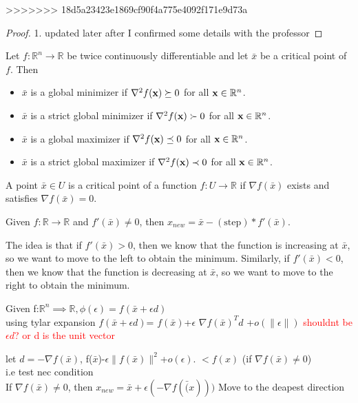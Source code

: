 >>>>>>> 18d5a23423e1869cf90f4a775e4092f171e9d73a
\begin{proof}
    1. updated later after I confirmed some details with the professor
\end{proof}
\begin{theorem}[]
  Let $f: \mathbb R^n \to \mathbb R$ be twice continuously differentiable and let $\bar{x}$ be a critical point of $f$. Then
  \begin{itemize}
    \item $\bar x$ is a global minimizer if $\nabla^2 f(\textbf{x}) \succeq 0$ for all $\textbf{x} \in \mathbb R^n$.
    \item $\bar x$ is a strict global minimizer if $\nabla^2 f(\textbf{x}) \succ 0$ for all $\textbf{x} \in \mathbb R^n$.
    \item $\bar x$ is a global maximizer if $\nabla^2 f(\textbf{x}) \preceq 0$ for all $\textbf{x} \in \mathbb R^n$.
    \item $\bar x$ is a strict global maximizer if $\nabla^2 f(\textbf{x}) \prec 0$ for all $\textbf{x} \in \mathbb R^n$.
  \end{itemize}
\end{theorem}

\begin{definition}
    A point $\bar x \in U$ is a critical point of a function $f: U \rightarrow \mathbb R$ if $\nabla f(\bar x)$ exists and satisfies $\nabla f(\bar x) = 0$.
\end{definition}

\begin{problem}
    Given $f: \mathbb{R}\rightarrow \mathbb{R}$ and $f'(\bar{x})\neq 0$, then $x_{new}=\bar{x}-(\text{step})*f'(\bar{x})$.
    
    The idea is that if $f'(\bar x) > 0$, then we know that the function is increasing at $\bar x$, so we want to move to the left to obtain the minimum. Similarly, if $f'(\bar x) < 0$, then we know that the function is decreasing at $\bar x$, so we want to move to the right to obtain the minimum.
\end{problem}

\begin{problem}
    Given f:$\mathbb{R}^n \implies \mathbb{R}, \phi(\epsilon)=f(\bar{x}+\epsilon d)$ 
    \\ using tylar expansion 
    $f(\bar{x}+\epsilon d)$=
    $f(\bar{x})$+$\epsilon$ $\nabla f(\bar{x})^T d$ +$o(\|\epsilon\|)$ \textcolor{red}{shouldnt be $\epsilon d$? or d is the unit vector}

    let $d=-\nabla f(\bar{x})$, f($\bar{x}$)-$\epsilon \| f(\bar{x})\|^2$+$o(\epsilon)$.
    $<f(x)$ (if $\nabla f(\bar{x})\neq 0$)
    \\ i.e test nec condition 
    \\ If $\nabla f(\bar{x})\neq 0$, then $x_{new}=\bar{x}+\epsilon(-\nabla f(\bar(x)))$
    Move to the deapest direction


    
\end{problem}

